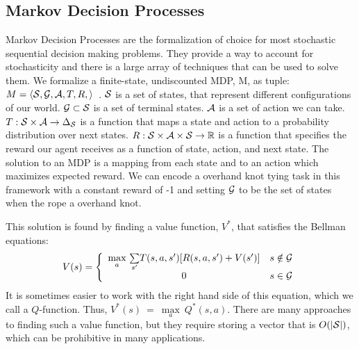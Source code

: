 
\subsection{Markov Decision Processes}
Markov Decision Processes are the formalization of choice for most stochastic sequential decision making problems.
They provide a way to account for stochasticity and there is a large array of techniques that can be used to solve them.
We formalize a finite-state, undiscounted MDP, M, as tuple: $M = \langle\mathcal{S},\mathcal{G}, \mathcal{A},T,R, \rangle$~\cite{puterman1994}.
$\mathcal{S}{}$ is a set of states, that represent different configurations of our world.
$\mathcal{G}{} \subset \mathcal{S}{}$ is a set of terminal states.  
$\mathcal{A}{}$ is a set of action we can take.
$T:\mathcal{S}{} \times \mathcal{A}{} \rightarrow \Delta_{\mathcal{S}{}}$ is a function that maps a state and action to a probability distribution over next states.
$R:\mathcal{S}{}\times \mathcal{A}{} \times \mathcal{S}{} \rightarrow \mathbb{R}$ is a function that specifies the reward our agent receives as a function of state, action, and next state.
The solution to an MDP is a mapping from each state and to an action which maximizes expected reward. 
We can encode a overhand knot tying task in this framework with a constant reward of -1 
and setting $\mathcal{G}{}$ to be the set of states when the rope a overhand knot.

This solution is found by finding a value function, $V^*$, that satisfies the Bellman equations:
$${V(s) = \left\{ \begin{array}{cl} \underset{a}{\max}\ \underset{s'}{\sum} T(s, a, s')[R(s, a, s') + V(s')] & s\notin \mathcal{G}{}\\ 0 & s\in \mathcal{G}{}\end{array}\right.}$$
It is sometimes easier to work with the right hand side of this equation, which we call a $Q$-function. Thus, $V^*(s)~=~\underset{a}{\max}\ Q^*(s, a)$.
There are many approaches to finding such a value function, but they require storing a vector that is $O(|\mathcal{S}{}|)$, which can be prohibitive in many applications. 


